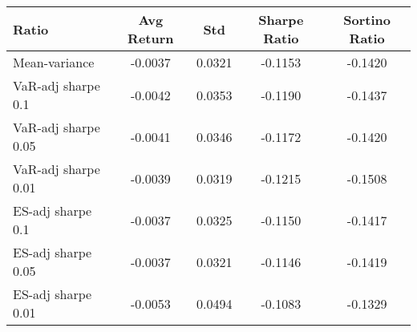 \begin{tabular}{lcccc}
\toprule
Ratio & Avg Return & Std & Sharpe Ratio & Sortino Ratio\\
\midrule
Mean-variance & -0.0037 & 0.0321 & -0.1153 & -0.1420\\
VaR-adj sharpe 0.1 & -0.0042 & 0.0353 & -0.1190 & -0.1437\\
VaR-adj sharpe 0.05 & -0.0041 & 0.0346 & -0.1172 & -0.1420\\
VaR-adj sharpe 0.01 & -0.0039 & 0.0319 & -0.1215 & -0.1508\\
ES-adj sharpe 0.1 & -0.0037 & 0.0325 & -0.1150 & -0.1417\\
ES-adj sharpe 0.05 & -0.0037 & 0.0321 & -0.1146 & -0.1419\\
ES-adj sharpe 0.01 & -0.0053 & 0.0494 & -0.1083 & -0.1329\\
\bottomrule
\end{tabular}
